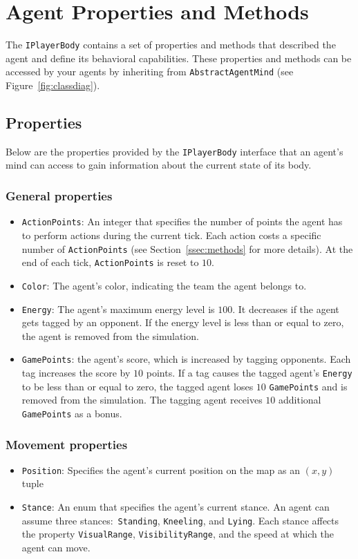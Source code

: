 \documentclass[a4paper,english,DIV=16,11pt,parskip=half,dvipsnames,listof=totoc,index=totoc,bibliography=totoc]{scrartcl}
\begin{document}
\section{Agent Properties and Methods} \label{sec:AgentDesc}
The \texttt{IPlayerBody} contains a set of properties and methods that described the agent and define its behavioral capabilities. These properties and methods can be accessed by your agents by inheriting from \texttt{AbstractAgentMind} (see Figure~\ref{fig:classdiag}).
%
\subsection{Properties} \label{ssec:props}
Below are the properties provided by the \texttt{IPlayerBody} interface that an agent's mind can access to gain information about the current state of its body.
%
\subsubsection{General properties} \label{sssec:genAttr}
\begin{itemize}
  \item \texttt{ActionPoints}: An integer that specifies the number of points the agent has to perform actions during the current tick. Each action costs a specific number of \texttt{ActionPoints} (see Section~\ref{ssec:methods} for more details). At the end of each tick, \texttt{ActionPoints} is reset to $10$.
  \item \texttt{Color}: The agent's color, indicating the team the agent belongs to.
  \item \texttt{Energy}: The agent's maximum energy level is $100$. It decreases if the agent gets tagged by an opponent. If the energy level is less than or equal to zero, the agent is removed from the simulation.
  \item \texttt{GamePoints}: the agent's score, which is increased by tagging opponents. Each tag increases the score by $10$ points. If a tag causes the tagged agent's \texttt{Energy} to be less than or equal to zero, the tagged agent loses $10$ \texttt{GamePoints} and is removed from the simulation. The tagging agent receives $10$ additional \texttt{GamePoints} as a bonus.
\end{itemize}
%
\subsubsection{Movement properties} \label{sssec:movAttr}
\begin{itemize}
  \item \texttt{Position}: Specifies the agent's current position on the map as an $(x,y)$ tuple
  \item \texttt{Stance}: An enum that specifies the agent's current stance. An agent can assume three stances:~\texttt{Standing}, \texttt{Kneeling}, and \texttt{Lying}. Each stance affects the property \texttt{VisualRange}, \texttt{VisibilityRange}, and the speed at which the agent can move.
\end{itemize}
%
\end{document}
